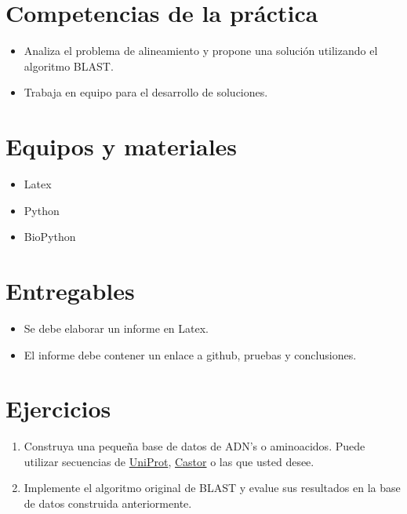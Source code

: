 \documentclass{article}
\begin{document}
	
	\section{Competencias de la práctica}
	\begin{itemize}
		\item Analiza el problema de alineamiento y propone una solución utilizando el algoritmo BLAST. 
		\item Trabaja en equipo para el desarrollo de soluciones.
	\end{itemize}
	
	\section{Equipos y materiales}
	\begin{itemize}
		\item Latex
		\item Python
		\item BioPython
	\end{itemize}
	
	\section{Entregables}
	\begin{itemize}
		\item Se debe elaborar un informe en Latex.
		\item El informe debe contener un enlace a github, pruebas y conclusiones.
	\end{itemize}
	
	
	
	
	\clearpage
	
	
	\section{Ejercicios}\label{sec:ejercicios}
		

	\begin{enumerate}		
		\item Construya una pequeña base de datos de ADN's o aminoacidos. Puede utilizar secuencias de \href{https://www.uniprot.org/}{UniProt}, \href{http://castor.bioinfo.uqam.ca/}{Castor} o las que usted desee.
		 
		 \item Implemente el algoritmo original de BLAST y evalue sus resultados en la base de datos construida anteriormente. 
	\end{enumerate}
\end{document}
